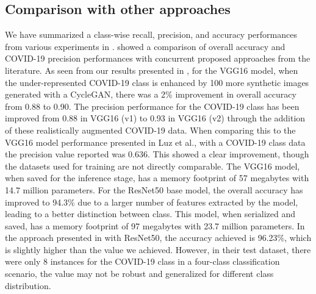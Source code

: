 \subsection{Comparison with other approaches}
We have summarized a class-wise recall, precision, and accuracy performances from various experiments in  .  showed a comparison of overall accuracy and COVID-19 precision performances with concurrent proposed approaches from the literature. As seen from our results presented in , for the VGG16 model, when the under-represented COVID-19 class is enhanced by 100 more synthetic images generated with a CycleGAN, there was a 2\% improvement in overall accuracy from 0.88 to 0.90. The precision performance for the COVID-19 class has been improved from 0.88 in VGG16 (v1) to 0.93 in VGG16 (v2) through the addition of these realistically augmented COVID-19 data. When comparing this to the VGG16 model performance presented in Luz et al.\cite{luz2020efficient},  with a COVID-19 class data the precision value reported was 0.636. This showed a clear improvement, though the datasets used for training are not directly comparable. The VGG16 model, when saved for the inference stage, has a memory footprint of 57 megabytes with 14.7 million parameters. For the ResNet50 base model, the overall accuracy has improved to 94.3\% due to a larger number of features extracted by the model, leading to a better distinction between class. This model, when serialized and saved, has a memory footprint of 97 megabytes with 23.7 million parameters. In the approach presented in \cite{farooq2020covid} with ResNet50, the accuracy achieved is 96.23\%, which is slightly higher than the value we achieved. However, in their test dataset, there were only 8 instances for the COVID-19 class in a four-class classification scenario, the value may not be robust and generalized for different class distribution.

